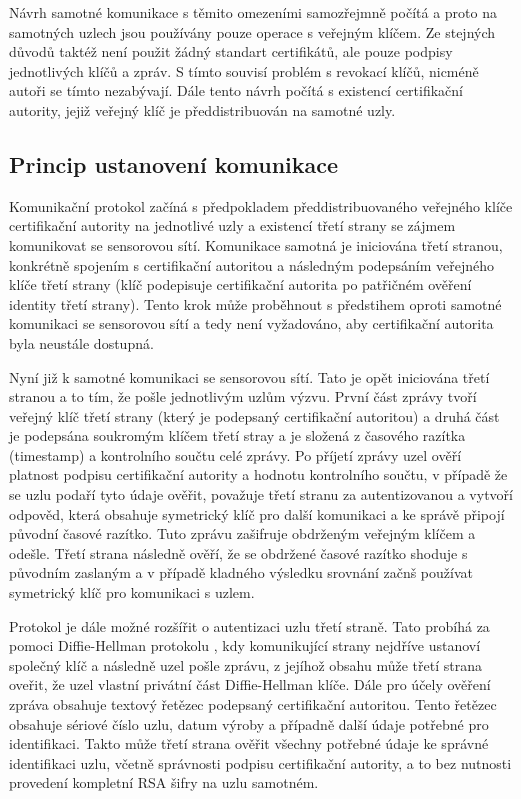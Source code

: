 \documentclass[11pt,final,twoside]{fithesis2}
\begin{document}
Návrh samotné komunikace s těmito omezeními samozřejmně počítá a proto na samotných uzlech jsou používány
pouze operace s veřejným klíčem. Ze stejných důvodů taktéž není použit žádný standart certifikátů, ale 
pouze podpisy jednotlivých klíčů a zpráv. S tímto souvisí problém s revokací klíčů, nicméně autoři se tímto nezabývají.
Dále tento návrh počítá s existencí certifikační autority, jejiž veřejný klíč je předdistribuován na samotné uzly. 

\subsection{Princip ustanovení komunikace}
Komunikační protokol začíná s předpokladem předdistribuovaného veřejného klíče certifikační autority na jednotlivé
uzly a existencí třetí strany se zájmem komunikovat se sensorovou sítí. Komunikace samotná je iniciována třetí
stranou, konkrétně spojením s certifikační autoritou a následným podepsáním veřejného klíče třetí strany (klíč podepisuje 
certifikační autorita po patřičném ověření identity třetí strany). Tento krok může proběhnout s předstihem oproti samotné 
komunikaci se sensorovou sítí a tedy není vyžadováno, aby certifikační autorita byla neustále dostupná. 

Nyní již k samotné komunikaci se sensorovou sítí. Tato je opět iniciována třetí stranou a to tím, že pošle jednotlivým uzlům 
výzvu. První část zprávy tvoří veřejný klíč třetí strany (který je podepsaný certifikační autoritou) a druhá část je podepsána 
soukromým klíčem třetí stray a je složená z časového razítka (timestamp) a kontrolního součtu celé zprávy. Po příjetí zprávy
uzel ověří platnost podpisu certifikační autority a hodnotu kontrolního součtu, v případě že se uzlu podaří tyto údaje ověřit, 
považuje třetí stranu za autentizovanou a vytvoří odpověd, která obsahuje symetrický klíč pro další komunikaci a ke správě připojí 
původní časové razítko. Tuto zprávu zašifruje obdrženým veřejným klíčem a odešle. Třetí strana následně ověří, že se obdržené 
časové razítko shoduje s původním zaslaným a v případě kladného výsledku srovnání začnš používat symetrický klíč pro 
komunikaci s uzlem.

Protokol je dále možné rozšířit o autentizaci uzlu třetí straně. Tato probíhá za pomoci Diffie-Hellman protokolu \cite{Diffie1976}, 
kdy komunikující strany nejdříve ustanoví společný klíč a následně uzel pošle zprávu, z jejíhož obsahu může třetí strana oveřit,
že uzel vlastní privátní část Diffie-Hellman klíče. Dále pro účely ověření zpráva obsahuje  textový řetězec podepsaný 
certifikační autoritou. Tento řetězec obsahuje sériové číslo uzlu, datum výroby a případně další údaje potřebné pro identifikaci. 
Takto může třetí strana ověřit všechny potřebné údaje ke správné identifikaci uzlu, včetně správnosti podpisu certifikační autority, 
a to bez nutnosti provedení kompletní RSA šifry na uzlu samotném.
\end{document}

